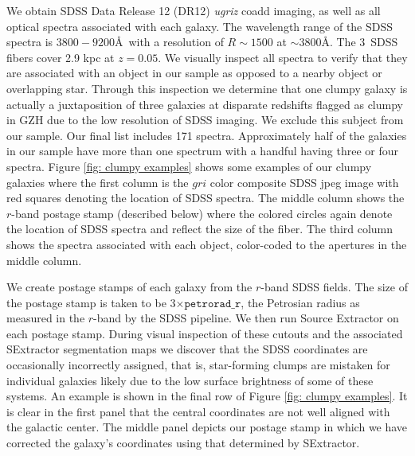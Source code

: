 We obtain SDSS Data Release 12 (DR12) \textit{ugriz} coadd imaging, as well as all optical spectra associated with each galaxy. The wavelength range of the SDSS spectra is $3800-9200$\AA~with a resolution of $R\sim 1500$ at $\sim3800$\AA. The $3$\arcsec~SDSS fibers cover 2.9 kpc at $z=0.05$. We visually inspect all spectra to verify that they are associated with an object in our sample as opposed to a nearby object or overlapping star. Through this inspection we determine that one clumpy galaxy is actually a juxtaposition of three galaxies at disparate redshifts flagged as clumpy in GZH due to the low resolution of SDSS imaging. We exclude this subject from our sample. Our final list includes 171 spectra. Approximately half of the galaxies in our sample have more than one spectrum with a handful having three or four spectra. Figure \ref{fig: clumpy examples} shows some examples of our clumpy galaxies where the first column is the $gri$ color composite SDSS jpeg image with red squares denoting the location of SDSS spectra. The middle column shows the $r$-band postage stamp (described below) where the colored circles again denote the location of SDSS spectra and reflect the size of the fiber. The third column shows the spectra associated with each object, color-coded to the apertures in the middle column. 


We create postage stamps of each galaxy from the $r$-band SDSS fields.  The size of the postage stamp is taken to be 3$\times\mathtt{petrorad\_r}$, the Petrosian radius as measured in the $r$-band by the SDSS pipeline. We then run Source Extractor \citep{sextractor} on each postage stamp. During visual inspection of these cutouts and the associated SExtractor segmentation maps we discover that the SDSS coordinates are occasionally incorrectly assigned, that is, star-forming clumps are mistaken for individual galaxies likely due to the low surface brightness of some of these systems. An example is shown in the final row of Figure \ref{fig: clumpy examples}. It is clear in the first panel that the central coordinates are not well aligned with the galactic center. The middle panel depicts our postage stamp in which we have corrected the galaxy's coordinates using that determined by SExtractor. 

